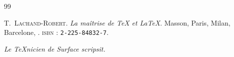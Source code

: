 \documentclass[full, french]{l3doc}
\begin{document}

\begin{thebibliography}{99}
 T.~\textsc{Lachand-Robert}.
\emph{La maîtrise de \TeX{} et \LaTeX{}}.
Masson, Paris, Milan, Barcelone, .
\textsc{isbn} : \texttt{2-225-84832-7}.
\end{thebibliography}


\noindent\hspace*{0.2\textwidth}\hrulefill\hspace*{0.2\textwidth}
\begin{center}
  \textsl{Le TeXnicien de Surface scripsit.}
\end{center}
\noindent\hspace*{0.2\textwidth}\hrulefill\hspace*{0.2\textwidth}

\end{document}
